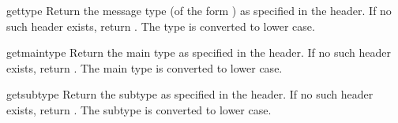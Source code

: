 \begin{methoddesc}{gettype}{}
Return the message type (of the form )
as specified in the  header.  If no such header
exists, return .  The type is converted to lower
case.
\end{methoddesc}

\begin{methoddesc}{getmaintype}{}
Return the main type as specified in the  header.
If no such header exists, return .  The main type is
converted to lower case.
\end{methoddesc}

\begin{methoddesc}{getsubtype}{}
Return the subtype as specified in the  header.  If
no such header exists, return .  The subtype is
converted to lower case.
\end{methoddesc}
